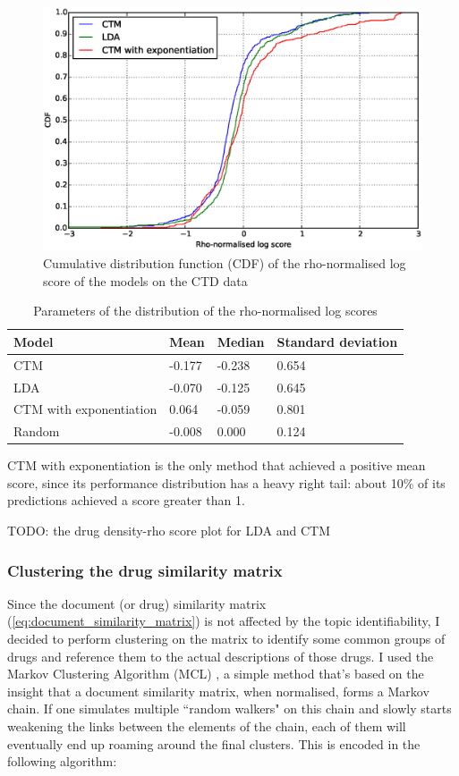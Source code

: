 \documentclass[12pt,a4paper,twoside,openright]{report}
\begin{document}
\begin{figure}[!htb]
\includegraphics[width=\textwidth]{ctd-rho-cdf.eps}
\caption{Cumulative distribution function (CDF) of the rho-normalised log score of the models on the CTD data}
\label{fig:ctd-rho-cdf}
\end{figure}

\begin{table}
\begin{tabular}{| l | l | l | l |}
\hline
Model & Mean & Median & Standard deviation\\
\hline
CTM & -0.177 & -0.238 & 0.654 \\
LDA & -0.070 & -0.125 & 0.645 \\
CTM with exponentiation & 0.064 & -0.059 & 0.801 \\
Random & -0.008 & 0.000 & 0.124 \\
\hline
\end{tabular}
\caption{Parameters of the distribution of the rho-normalised log scores}
\label{tab:ctm-ctf-summary}
\end{table}

CTM with exponentiation is the only method that achieved a positive mean score, since its performance distribution has a heavy right tail: about 10\% of its predictions achieved a score greater than 1.

TODO: the drug density-rho score plot for LDA and CTM

\subsubsection{Clustering the drug similarity matrix}
Since the document (or drug) similarity matrix (\ref{eq:document_similarity_matrix}) is not affected by the topic identifiability, I decided to perform clustering on the matrix to identify some common groups of drugs and reference them to the actual descriptions of those drugs.
I used the Markov Clustering Algorithm (MCL)  \cite{Dongen:2000:CAG:868986}, a simple method that's based on the insight that a document similarity matrix, when normalised, forms a Markov chain. If one simulates multiple ``random walkers" on this chain and slowly starts weakening the links between the elements of the chain, each of them will eventually end up roaming around the final clusters. This is encoded in the following algorithm:
\end{document}
